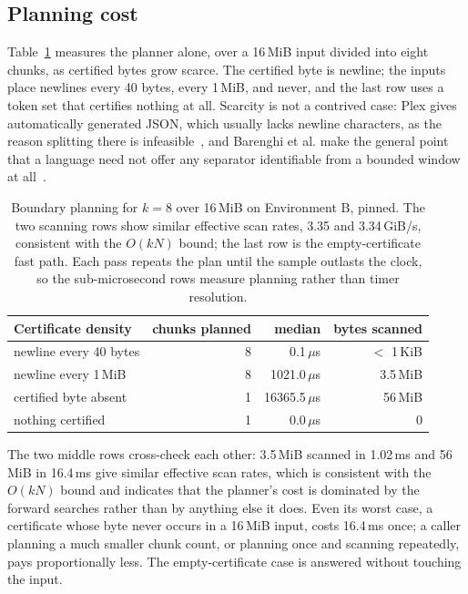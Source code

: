 \documentclass[11pt,a4paper]{article}
\theoremstyle{definition}
\theoremstyle{plain}
\begin{document}
\subsection{Planning cost}
\label{sec:planning}

Table~\ref{tab:planning} measures the planner alone, over a 16\,MiB input divided into eight chunks, as certified
bytes grow scarce. The certified byte is newline; the inputs place newlines every 40 bytes, every 1\,MiB, and never,
and the last row uses a token set that certifies nothing at all. Scarcity is not a contrived case: Plex gives
automatically generated JSON, which usually lacks newline characters, as the reason splitting there is
infeasible~\cite{li2021plex}, and Barenghi et al. make the general point that a language need not offer any separator
identifiable from a bounded window at all~\cite{barenghi2015parallel}.

\begin{table}[t]
\centering
\begin{tabular}{lrrr}
\toprule
Certificate density & chunks planned & median & bytes scanned \\
\midrule
newline every 40 bytes    & 8 & 0.1\,$\mu$s     & $<$ 1\,KiB \\
newline every 1\,MiB      & 8 & 1021.0\,$\mu$s  & 3.5\,MiB \\
certified byte absent     & 1 & 16365.5\,$\mu$s & 56\,MiB \\
nothing certified         & 1 & 0.0\,$\mu$s     & 0 \\
\bottomrule
\end{tabular}
\caption{Boundary planning for $k=8$ over 16\,MiB on Environment B, pinned. The two scanning rows show similar
effective scan rates, 3.35 and 3.34\,GiB/s, consistent with the $O(kN)$ bound; the last row is the empty-certificate
fast path. Each pass repeats
the plan until the sample outlasts the clock, so the sub-microsecond rows measure planning rather than timer
resolution.}
\label{tab:planning}
\end{table}

The two middle rows cross-check each other: 3.5\,MiB scanned in 1.02\,ms and 56\,MiB in 16.4\,ms give similar
effective scan rates, which is consistent with the $O(kN)$ bound and indicates that the planner's cost is dominated by
the forward searches rather than by anything else it does. Even its worst case, a certificate whose byte never occurs
in a 16\,MiB input, costs 16.4\,ms once; a caller planning a much smaller chunk count, or planning once and scanning
repeatedly, pays proportionally less. The empty-certificate case is answered without touching the input.
\end{document}
